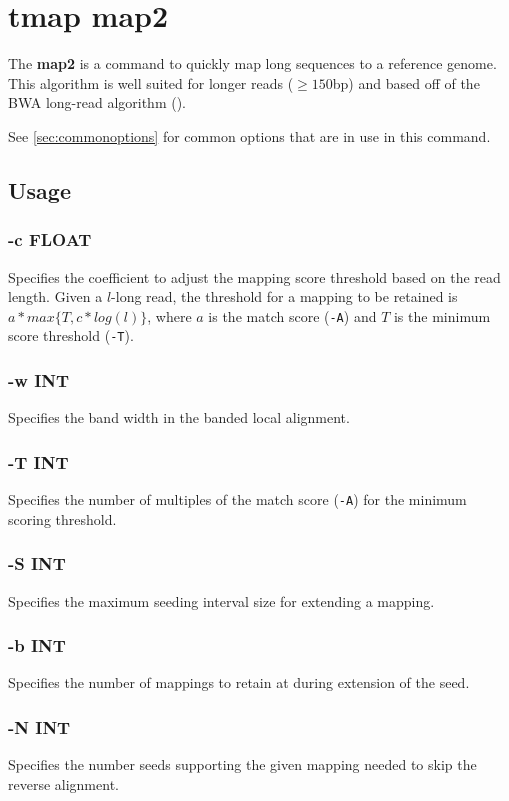 \documentclass[a4paper,12pt]{book}
\newcommand{\TT}[1]{{\tt #1}} %
\newcommand{\BF}[1]{{\bf #1}} %
\begin{document}
\section{tmap map2}
\label{sec:map2}
The \BF{map2} is a command to quickly map long sequences to a reference genome.
This algorithm is well suited for longer reads ($\geq 150$bp) and based off of the BWA long-read algorithm (\cite{BWA-long}).

See \autoref{sec:commonoptions} for common options that are in use in this command.

\subsection{Usage}

\subsubsection{-c FLOAT}
Specifies the coefficient to adjust the mapping score threshold based on the read length.
Given a $l$-long read, the threshold for a mapping to be retained is $a*max\{T,c*log(l)\}$, where $a$ is the match score (\TT{-A}) and $T$ is the minimum score threshold (\TT{-T}).

\subsubsection{-w INT}
Specifies the band width in the banded local alignment.

\subsubsection{-T INT}
Specifies the number of multiples of the match score (\TT{-A}) for the minimum scoring threshold.

\subsubsection{-S INT}
Specifies the maximum seeding interval size for extending a mapping.

\subsubsection{-b INT}
Specifies the number of mappings to retain at during extension of the seed.

\subsubsection{-N INT}
Specifies the number seeds supporting the given mapping needed to skip the reverse alignment.
\end{document}
